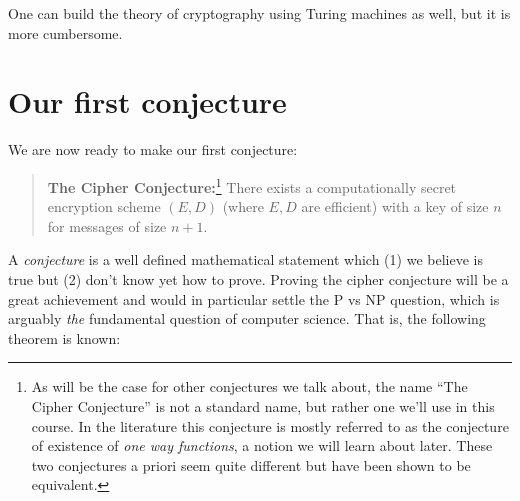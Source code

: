 One can build the theory of cryptography using Turing machines as well,
but it is more cumbersome.

\hypertarget{computebeyondfunctions}{}

\section{Our first conjecture}\label{2-Our-first-conjecture}

We are now ready to make our first conjecture:

\begin{quote}
\textbf{The Cipher Conjecture:}\footnote{As will be the case for other
  conjectures we talk about, the name ``The Cipher Conjecture'' is not a
  standard name, but rather one we'll use in this course. In the
  literature this conjecture is mostly referred to as the conjecture of
  existence of \emph{one way functions}, a notion we will learn about
  later. These two conjectures a priori seem quite different but have
  been shown to be equivalent.} There exists a computationally secret
encryption scheme \((E,D)\) (where \(E,D\) are efficient) with a key of
size \(n\) for messages of size \(n+1\).
\end{quote}

A \emph{conjecture} is a well defined mathematical statement which (1)
we believe is true but (2) don't know yet how to prove. Proving the
cipher conjecture will be a great achievement and would in particular
settle the P vs NP question, which is arguably \emph{the} fundamental
question of computer science. That is, the following theorem is known:

\hypertarget{PNPcipherthm}{}

